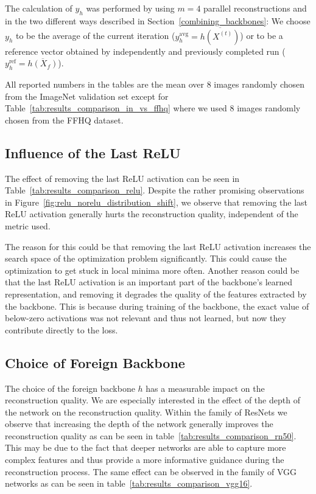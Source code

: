 \documentclass[10pt,twocolumn]{article}
\begin{document}
The calculation of $y_h$ was performed by using $m=4$ parallel reconstructions and in the two different ways described in Section~\ref{combining_backbones}:
We choose $y_h$ to be the average of the current iteration ($y_h^\text{avg}=\overline{h(X^{(t)})}$) or to be a reference vector obtained by independently and previously completed run ($y_h^\text{ref}=\overline{h(X_f)}$).

All reported numbers in the tables are the mean over 8 images randomly chosen from the ImageNet validation set except for Table~\ref{tab:results_comparison_in_vs_ffhq} where we used 8 images randomly chosen from the FFHQ dataset\cite{karras2019style}.

\subsection{Influence of the Last ReLU}
The effect of removing the last ReLU activation can be seen in Table~\ref{tab:results_comparison_relu}.
Despite the rather promising observations in Figure~\ref{fig:relu_norelu_distribution_shift}, we observe that removing the last ReLU activation generally hurts the reconstruction quality, independent of the metric used.

The reason for this could be that removing the last ReLU activation increases the search space of the optimization problem significantly.
This could cause the optimization to get stuck in local minima more often.
Another reason could be that the last ReLU activation is an important part of the backbone's learned representation, and removing it degrades the quality of the features extracted by the backbone.
This is because during training of the backbone, the exact value of below-zero activations was not relevant and thus not learned, but now they contribute directly to the loss.

\subsection{Choice of Foreign Backbone}
The choice of the foreign backbone $h$ has a measurable impact on the reconstruction quality.
We are especially interested in the effect of the depth of the network on the reconstruction quality.
Within the family of ResNets we observe that increasing the depth of the network generally improves the reconstruction quality as can be seen in table~\ref{tab:results_comparison_rn50}.
This may be due to the fact that deeper networks are able to capture more complex features and thus provide a more informative guidance during the reconstruction process.
The same effect can be observed in the family of VGG networks as can be seen in table~\ref{tab:results_comparison_vgg16}.
\end{document}
